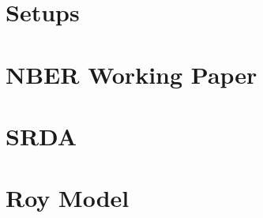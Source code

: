 \documentclass[12pt]{article}
\begin{document}
 
\section{Setups}






\section{NBER Working Paper}


\section{SRDA}


\section{Roy Model}

\end{document}
